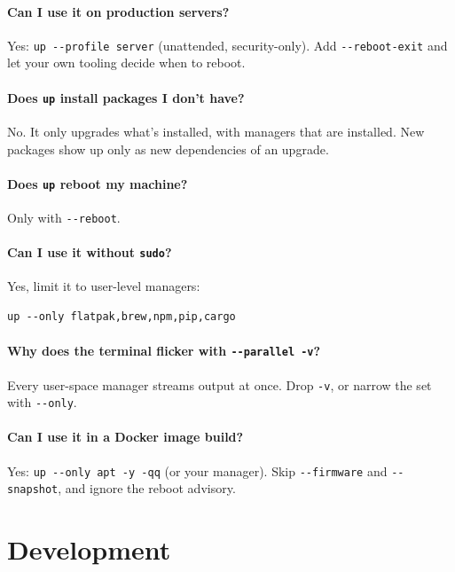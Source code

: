 \documentclass[11pt,a4paper]{article}
\begin{document}
\paragraph{Can I use it on production servers?}
Yes: \verb|up --profile server| (unattended, security-only). Add
\texttt{-{}-reboot-exit} and let your own tooling decide when to reboot.

\paragraph{Does \texttt{up} install packages I don't have?}
No. It only upgrades what's installed, with managers that are installed.
New packages show up only as new dependencies of an upgrade.

\paragraph{Does \texttt{up} reboot my machine?}
Only with \texttt{-{}-reboot}.

\paragraph{Can I use it without \texttt{sudo}?}
Yes, limit it to user-level managers:

\begin{lstlisting}[language=bashplus]
up --only flatpak,brew,npm,pip,cargo
\end{lstlisting}

\paragraph{Why does the terminal flicker with \texttt{-{}-parallel -v}?}
Every user-space manager streams output at once. Drop \texttt{-v}, or
narrow the set with \texttt{-{}-only}.

\paragraph{Can I use it in a Docker image build?}
Yes: \verb|up --only apt -y -qq| (or your manager). Skip
\texttt{-{}-firmware} and \texttt{-{}-snapshot}, and ignore the reboot
advisory.

\section{Development}\label{sec:dev}
\end{document}
